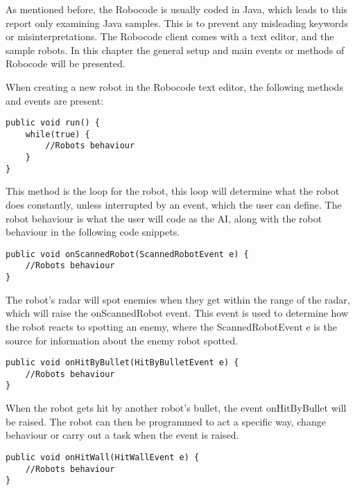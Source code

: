 As mentioned before, the Robocode is usually coded in Java, which leads to this report only examining Java samples. This is to prevent any misleading keywords or misinterpretations. The Robocode client comes with a text editor, and the sample robots. In this chapter the general setup and main events or methods of Robocode will be presented.

When creating a new robot in the Robocode text editor, the following methods and events are present:

\begin{lstlisting}[caption={Example of the main loop in Robocode} label=run, xleftmargin=.2\textwidth]
public void run() {
	while(true) {
		//Robots behaviour
	}
}
\end{lstlisting}

This method is the loop for the robot, this loop will determine what the robot does constantly, unless interrupted by an event, which the user can define. The robot behaviour is what the user will code as the AI, along with the robot behaviour in the following code snippets.

\begin{lstlisting}[caption={Example of the onScannedRobot event from Robocode} label=osr, xleftmargin=.2\textwidth]
public void onScannedRobot(ScannedRobotEvent e) {
	//Robots behaviour
}
\end{lstlisting}

The robot’s radar will spot enemies when they get within the range of the radar, which will raise the onScannedRobot event. This event is used to determine how the robot reacts to spotting an enemy, where the ScannedRobotEvent e is the source for information about the enemy robot spotted.

\begin{lstlisting}[caption={Example of the onHitByBullet event from Robocode} label=ohbb, xleftmargin=.2\textwidth]
public void onHitByBullet(HitByBulletEvent e) {
	//Robots behaviour
}
\end{lstlisting}

When the robot gets hit by another robot’s bullet, the event onHitByBullet will be raised. The robot can then be programmed to act a specific way, change behaviour or carry out a task when the event is raised.

\begin{lstlisting}[caption={Example of the onHitWall event from Robocode} label=ohw, xleftmargin=.2\textwidth]
public void onHitWall(HitWallEvent e) {
	//Robots behaviour
}
\end{lstlisting}


